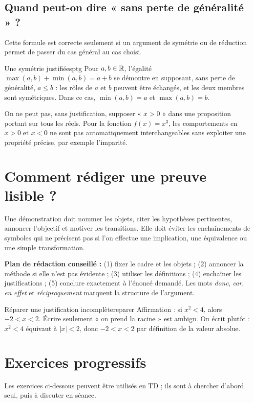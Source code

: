 \subsection{Quand peut-on dire « sans perte de généralité » ?}
Cette formule est correcte seulement si un argument de symétrie ou de réduction permet de passer du cas général au cas choisi.
\begin{exemple}{Une symétrie justifiée}{sptg}
Pour $a,b\in\mathbb R$, l'égalité $\max(a,b)+\min(a,b)=a+b$ se démontre en supposant, sans perte de généralité, $a\le b$ : les rôles de $a$ et $b$ peuvent être échangés, et les deux membres sont symétriques. Dans ce cas, $\min(a,b)=a$ et $\max(a,b)=b$.
\end{exemple}
\begin{attention}
On ne peut pas, sans justification, supposer « $x>0$ » dans une proposition portant sur tous les réels. Pour la fonction $f(x)=x^3$, les comportements en $x>0$ et $x<0$ ne sont pas automatiquement interchangeables sans exploiter une propriété précise, par exemple l'imparité.
\end{attention}

\section{Comment rédiger une preuve lisible ?}
Une démonstration doit nommer les objets, citer les hypothèses pertinentes, annoncer l'objectif et motiver les transitions. Elle doit éviter les enchaînements de symboles qui ne précisent pas si l'on effectue une implication, une équivalence ou une simple transformation.
\begin{retenir}
\textbf{Plan de rédaction conseillé :} (1) fixer le cadre et les objets ; (2) annoncer la méthode si elle n'est pas évidente ; (3) utiliser les définitions ; (4) enchaîner les justifications ; (5) conclure exactement à l'énoncé demandé. Les mots \emph{donc}, \emph{car}, \emph{en effet} et \emph{réciproquement} marquent la structure de l'argument.
\end{retenir}
\begin{exemple}{Réparer une justification incomplète}{reparer}
Affirmation : si $x^2<4$, alors $-2<x<2$. Écrire seulement « on prend la racine » est ambigu. On écrit plutôt : $x^2<4$ équivaut à $|x|<2$, donc $-2<x<2$ par définition de la valeur absolue.
\end{exemple}

\section{Exercices progressifs}
Les exercices ci-dessous peuvent être utilisés en TD ; ils sont à chercher d'abord seul, puis à discuter en séance.
